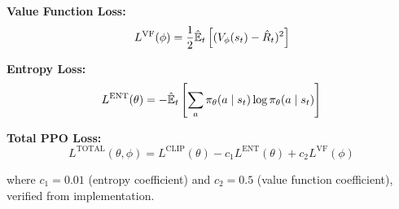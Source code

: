\documentclass[12pt]{article}
\theoremstyle{definition}
\theoremstyle{plain}
\begin{document}
\textbf{Value Function Loss:}
\begin{equation}
L^{\text{VF}}(\phi) = \frac{1}{2}\hat{\mathbb{E}}_t\left[(V_\phi(s_t) - \hat{R}_t)^2\right]
\end{equation}

\textbf{Entropy Loss:}
\begin{equation}
L^{\text{ENT}}(\theta) = -\hat{\mathbb{E}}_t\left[\sum_a \pi_\theta(a \mid s_t) \log \pi_\theta(a \mid s_t)\right]
\end{equation}

\textbf{Total PPO Loss:}
\begin{equation}
L^{\text{TOTAL}}(\theta, \phi) = L^{\text{CLIP}}(\theta) - c_1 L^{\text{ENT}}(\theta) + c_2 L^{\text{VF}}(\phi)
\end{equation}

where $c_1 = 0.01$ (entropy coefficient) and $c_2 = 0.5$ (value function coefficient), verified from implementation.
\end{document}
